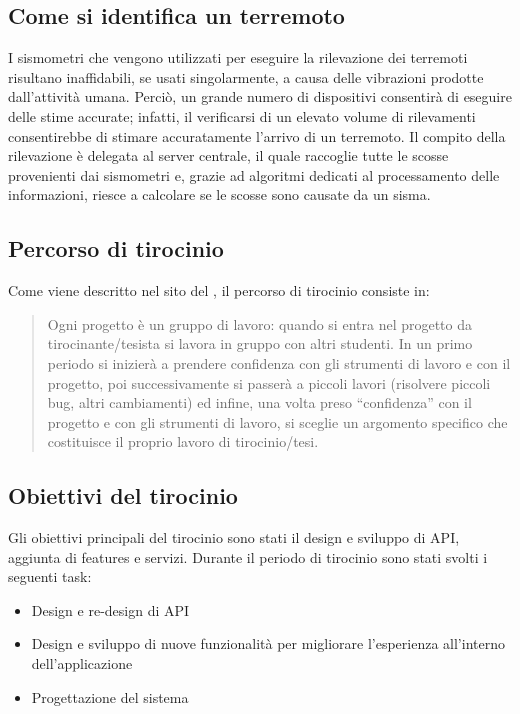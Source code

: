 \documentclass[main.tex]{subfiles}
\begin{document}
\subsection{Come si identifica un terremoto}
I sismometri che vengono utilizzati per eseguire la rilevazione dei terremoti risultano inaffidabili, se usati singolarmente, a causa delle vibrazioni prodotte dall'attività umana. Perciò, un grande numero di dispositivi consentirà di eseguire delle stime accurate; infatti, il verificarsi di un elevato volume di rilevamenti consentirebbe di stimare accuratamente l'arrivo di un terremoto.\newline
Il compito della rilevazione è delegata al server centrale, il quale raccoglie tutte le scosse provenienti dai sismometri e, grazie ad algoritmi dedicati al processamento delle \newline informazioni, riesce a calcolare se le scosse sono causate da un sisma.


\subsection{Percorso di tirocinio}
Come viene descritto nel sito del , il percorso di tirocinio consiste in:
\begin{quote}
Ogni progetto è un gruppo di lavoro: quando si entra nel progetto da tirocinante/tesista si lavora in gruppo con altri studenti. In un primo periodo si inizierà a prendere confidenza con gli strumenti di lavoro e con il progetto, poi successivamente si passerà a piccoli lavori (risolvere piccoli bug, altri cambiamenti) ed infine, una volta preso “confidenza” con il progetto e con gli strumenti di lavoro, si sceglie un argomento specifico che costituisce il proprio lavoro di tirocinio/tesi.\cite{percorso-tirocinio}
\end{quote}


\subsection{Obiettivi del tirocinio}
Gli obiettivi principali del tirocinio sono stati il design e sviluppo di API, aggiunta di features e servizi.
\newline
Durante il periodo di tirocinio sono stati svolti i seguenti task:
\begin{itemize}
    \item Design e re-design di API
    \item Design e sviluppo di nuove funzionalità per migliorare l'esperienza all'interno\newline
    dell'applicazione
    \item Progettazione del sistema 
\end{itemize}
\end{document}
